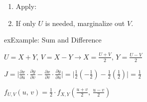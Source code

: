 \begin{enumerate}
\def\labelenumi{\arabic{enumi}.}
\setcounter{enumi}{2}
\item
  Apply:
\item
  If only $U$ is needed, marginalize out $V$.
\end{enumerate}

\begin{PSbox}[unbreakable]{ex}{Example: Sum and Difference}

$\displaystyle U = X + Y,\, V = X - Y \to X = \frac{U+V}{2},\, Y = \frac{U-V}{2}$

$\displaystyle J = \lvert \frac{\partial x}{\partial u} \cdot \frac{\partial y}{\partial v} - \frac{\partial x}{\partial v} \cdot \frac{\partial y}{\partial u}\rvert = \lvert \frac{1}{2}\left(-\frac{1}{2}\right) - \frac{1}{2}\left(\frac{1}{2}\right)\rvert = \frac{1}{2}$

$\displaystyle f_{U,V}(u,\,v) = \frac{1}{2} \cdot f_{X,Y}\left(\frac{u+v}{2},\, \frac{u-v}{2}\right)$

\end{PSbox}


